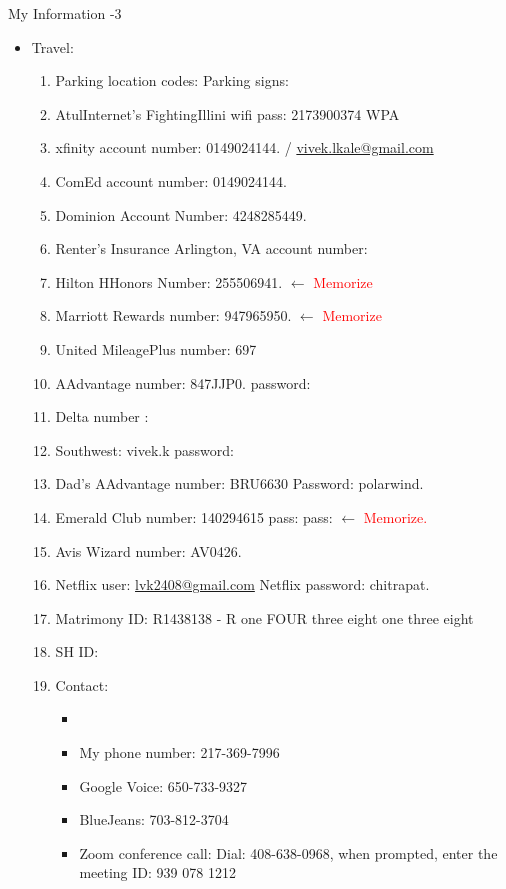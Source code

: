         \begin{frame}{My Information -3 }
          \begin{itemize}
            \conti  
	  \item Travel: 
            \begin{enumerate} 
            \item \tiny Parking location codes:   Parking signs: 
            \item \tiny AtulInternet’s FightingIllini  wifi pass: 2173900374 WPA
            \item \tiny xfinity account number: 0149024144. / \url{vivek.lkale@gmail.com}
            \item \tiny ComEd account number: 0149024144.
            \item \tiny Dominion Account Number: 4248285449. 
            \item \tiny Renter's Insurance Arlington, VA account number:
            \item \tiny Hilton HHonors Number: 255506941. $\longleftarrow$ \textcolor{red}{Memorize} 
            \item \tiny Marriott Rewards number: 947965950. $\longleftarrow$ \textcolor{red}{Memorize}
            \item \tiny United MileagePlus number: 697 
            \item \tiny AAdvantage number: 847JJP0. password: 
            \item \tiny Delta number : 
            \item \tiny Southwest: vivek.k password: 
            \item \tiny Dad's AAdvantage number: BRU6630 Password: polarwind.
            \item \tiny Emerald Club number:  140294615   pass:   pass: $\leftarrow$         \textcolor{red}{Memorize.} 
            \item \tiny Avis Wizard number: AV0426. 
            \item \tiny Netflix user:  \url{lvk2408@gmail.com}  Netflix password: chitrapat.
            \item \tiny Matrimony ID: R1438138 - R one FOUR three eight one three eight 
            \item \tiny SH ID:

            \item \tiny Contact: 
\begin{itemize}
             \item \tiny
             \item \tiny My phone number: 217-369-7996
\item \tiny Google Voice: 650-733-9327
\item \tiny BlueJeans: 703-812-3704 
\item \tiny Zoom conference call: Dial: 408-638-0968, when prompted, enter the meeting ID: 939 078 1212
\end{itemize}
            \end{enumerate}
          \end{itemize}
          
        \end{frame}

